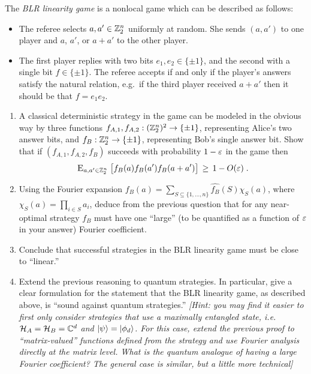 \begin{exercise}
The \emph{BLR linearity game} is a nonlocal game which can be described as follows: 
\begin{itemize}
\item The referee selects $a,a'\in\mathbb{Z}_2^n$ uniformly at random. She sends $(a,a')$ to one player and $a$, $a'$, or $a+a'$ to the other player. 
\item The first player replies with two bits $e_1,e_2\in\{\pm 1\}$, and the second with a single bit $f\in\{\pm 1\}$. The referee accepts if and only if the player's answers satisfy the natural relation, e.g.\ if the third player received $a+a'$ then it should be that $f=e_1e_2$. 
\end{itemize}
\begin{enumerate}
\item A classical deterministic strategy in the game can be modeled in the obvious way by three functions $f_{A,1},f_{A,2} : (\mathbb{Z}_2^n)^2 \to \{\pm 1\}$, representing Alice's two answer bits, and $f_B:\mathbb{Z}_2^n \to \{\pm 1\}$, representing Bob's single answer bit. Show that if $(f_{A,1},f_{A,2},f_B)$ succeeds with probability $1-\varepsilon$ in the game then 
\[ \textsc{E}_{a,a'\in \mathbb{Z}_2^n} \;\big[ f_B(a)f_B(a')f_B(a+a')\big] \,\geq\, 1-O(\varepsilon)\;.\]
\item  Using the Fourier expansion $f_B(a)=\sum_{S\subseteq\{1,\ldots,n\}} \widehat{f_B}(S) \chi_S(a)$, where $\chi_S(a)=\prod_{i\in S} a_i$, deduce from the previous question that for any near-optimal strategy $f_B$ must have one ``large'' (to be quantified as a function of $\varepsilon$ in your answer) Fourier coefficient. 
\item Conclude that successful strategies in the BLR linearity game must be close to ``linear.''
\item Extend the previous reasoning to quantum strategies. In particular, give a clear formulation for the statement that the BLR linearity game, as described above, is ``sound against quantum strategies.'' \emph{[Hint: you may find it easier to first only consider strategies that use a maximally entangled state, i.e. $\mathcal{H}_A = \mathcal{H}_B = \mathbb{C}^d$ and $|\psi\rangle = |\phi_d\rangle$. For this case, extend the previous proof to ``matrix-valued'' functions defined from the strategy and use Fourier analysis directly at the matrix level. What is the quantum analogue of having a large Fourier coefficient? The general case is similar, but a little more technical]}
\end{enumerate}

\end{exercise}


